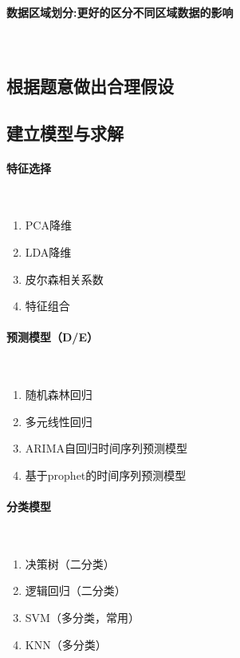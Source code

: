   \paragraph{数据区域划分:更好的区分不同区域数据的影响}~{}

\subsection{根据题意做出合理假设}

\subsection{建立模型与求解}

  \paragraph{特征选择}~{}

  \begin{enumerate}
    \item PCA降维
    \item LDA降维
    \item 皮尔森相关系数
    \item 特征组合
  \end{enumerate}

  \paragraph{预测模型（D/E）}~{}

  \begin{enumerate}
    \item 随机森林回归
    \item 多元线性回归
    \item ARIMA自回归时间序列预测模型
    \item 基于prophet的时间序列预测模型
  \end{enumerate}

  \paragraph{分类模型}~{}

  \begin{enumerate}
    \item 决策树（二分类）
    \item 逻辑回归（二分类）
    \item SVM（多分类，常用）
    \item KNN（多分类）
  \end{enumerate}